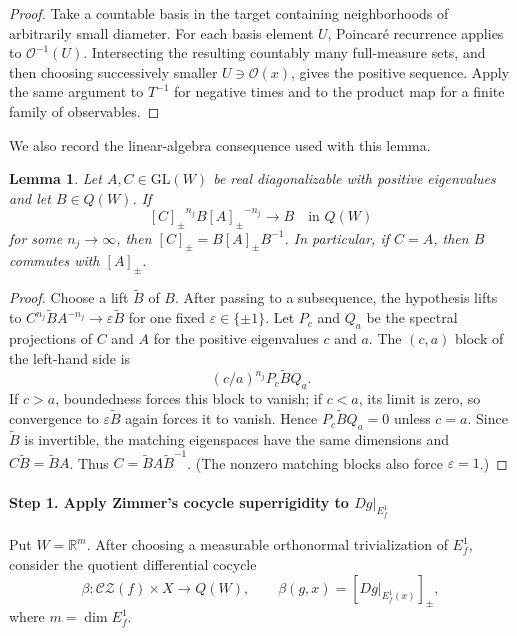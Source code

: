 \documentclass[11pt]{amsart}
\numberwithin{equation}{section}
\newcommand{\CZ}{\mathcal{CZ}}
\newcommand{\GL}{\mathrm{GL}}
\theoremstyle{plain}
\newtheorem{lem}[thm]{Lemma}
\begin{document}
\begin{proof}
Take a countable basis in the target containing neighborhoods of
arbitrarily small diameter.  For each basis element $U$, Poincar\'e
recurrence applies to $\mathcal O^{-1}(U)$.  Intersecting the resulting
countably many full-measure sets, and then choosing successively smaller
$U\ni\mathcal O(x)$, gives the positive sequence.  Apply the same
argument to $T^{-1}$ for negative times and to the product map for a
finite family of observables.
\end{proof}

We also record the linear-algebra consequence used with this lemma.

\begin{lem}\label{lem:positive-conjugation}
Let $A,C\in\GL(W)$ be real diagonalizable with positive eigenvalues and
let $B\in Q(W)$.  If
\[
{[C]_\pm}^{n_j}B{[A]_\pm}^{-n_j}\longrightarrow B
\quad\text{in }Q(W)
\]
for some $n_j\to\infty$, then ${[C]_\pm}=B{[A]_\pm} B^{-1}$.  In particular, if
$C=A$, then $B$ commutes with ${[A]_\pm}$.
\end{lem}

\begin{proof}

Choose a lift $\widetilde B$ of $B$.  After passing to a subsequence, the
hypothesis lifts to
$C^{n_j}\widetilde B A^{-n_j}\to\varepsilon\widetilde B$ for one fixed
$\varepsilon\in\{\pm1\}$.  Let $P_c$ and $Q_a$ be the spectral
projections of $C$ and $A$ for the positive eigenvalues $c$ and $a$.
The $(c,a)$ block of the left-hand side is
\[
 (c/a)^{n_j}P_c\widetilde BQ_a.
\]
If $c>a$, boundedness forces this block to vanish; if $c<a$, its limit is
zero, so convergence to $\varepsilon\widetilde B$ again forces it to
vanish.  Hence $P_c\widetilde BQ_a=0$ unless $c=a$.  Since
$\widetilde B$ is invertible, the matching eigenspaces have the same
dimensions and $C\widetilde B=\widetilde BA$.  Thus
$C=\widetilde B A\widetilde B^{-1}$.  (The nonzero matching blocks also
force $\varepsilon=1$.)

\end{proof}


\paragraph{\textbf{Step 1. Apply Zimmer's cocycle superrigidity to $Dg|_{E^1_f}$}}

Put $W=\mathbb R^m$.  After choosing a measurable
orthonormal trivialization of $E_f^1$, consider the
quotient differential cocycle
\[
\beta:\CZ(f)\times X\to Q(W),\qquad
\beta(g,x)=[Dg|_{E^1_f(x)}]_{\pm},
\]
where $m=\dim E^1_f$.
\end{document}
